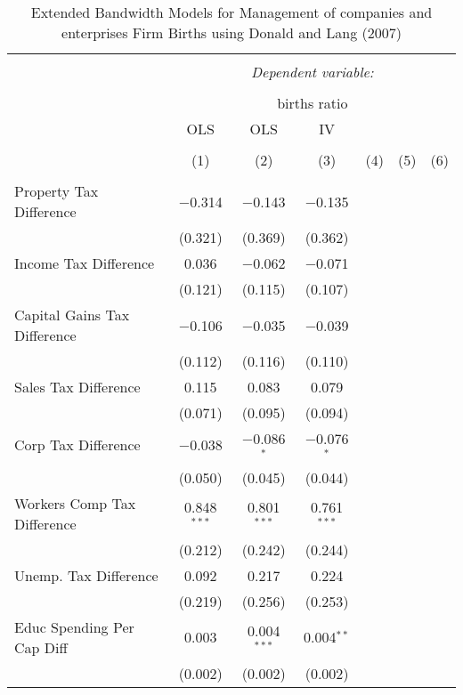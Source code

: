 
\begin{table}[!htbp] \centering 
  \caption{Extended Bandwidth Models for  Management of companies and enterprises Firm Births using Donald and Lang (2007)} 
  \label{} 
\begin{tabular}{@{\extracolsep{5pt}}lcccccc} 
\\[-1.8ex]\hline 
\hline \\[-1.8ex] 
 & \multicolumn{6}{c}{\textit{Dependent variable:}} \\ 
\cline{2-7} 
\\[-1.8ex] & \multicolumn{6}{c}{births ratio} \\ 
 & OLS & OLS & IV &  &  &  \\ 
\\[-1.8ex] & (1) & (2) & (3) & (4) & (5) & (6)\\ 
\hline \\[-1.8ex] 
 Property Tax Difference & $-$0.314 & $-$0.143 & $-$0.135 &  &  &  \\ 
  & (0.321) & (0.369) & (0.362) &  &  &  \\ 
  Income Tax Difference & 0.036 & $-$0.062 & $-$0.071 &  &  &  \\ 
  & (0.121) & (0.115) & (0.107) &  &  &  \\ 
  Capital Gains Tax Difference & $-$0.106 & $-$0.035 & $-$0.039 &  &  &  \\ 
  & (0.112) & (0.116) & (0.110) &  &  &  \\ 
  Sales Tax Difference & 0.115 & 0.083 & 0.079 &  &  &  \\ 
  & (0.071) & (0.095) & (0.094) &  &  &  \\ 
  Corp Tax Difference & $-$0.038 & $-$0.086$^{*}$ & $-$0.076$^{*}$ &  &  &  \\ 
  & (0.050) & (0.045) & (0.044) &  &  &  \\ 
  Workers Comp Tax Difference & 0.848$^{***}$ & 0.801$^{***}$ & 0.761$^{***}$ &  &  &  \\ 
  & (0.212) & (0.242) & (0.244) &  &  &  \\ 
  Unemp. Tax Difference & 0.092 & 0.217 & 0.224 &  &  &  \\ 
  & (0.219) & (0.256) & (0.253) &  &  &  \\ 
  Educ Spending Per Cap Diff & 0.003 & 0.004$^{***}$ & 0.004$^{**}$ &  &  &  \\ 
  & (0.002) & (0.002) & (0.002) &  &  &  \\ 

\end{tabular}
\end{table}
